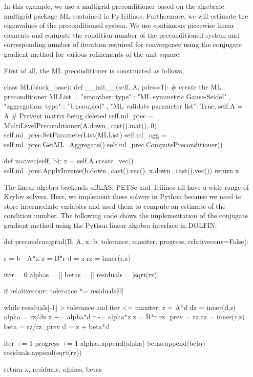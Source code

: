 In this example, we use a multigrid preconditioner based on the
algebraic multigrid package ML contained in
PyTrilinos. Furthermore, we will estimate the
eigenvalues of the preconditioned system. We use continuous piecewise
linear elements and compute the condition number of the preconditioned
system and corresponding number of iteration required for convergence
using the conjugate gradient method
for various refinements of the unit square.

First of all, the ML preconditioner is constructed as follows,
\begin{python}
class ML(block_base):
    def __init__(self, A, pdes=1):
        # create the ML preconditioner
        MLList = {
            "smoother: type"            : "ML symmetric Gauss-Seidel" ,
            "aggregation: type"         : "Uncoupled" ,
            "ML validate parameter list": True,
            }
        self.A = A # Prevent matrix being deleted
        self.ml_prec = MultiLevelPreconditioner(A.down_cast().mat(), 0)
        self.ml_prec.SetParameterList(MLList)
        self.ml_agg = self.ml_prec.GetML_Aggregate()
        self.ml_prec.ComputePreconditioner()

    def matvec(self, b):
        x = self.A.create_vec()
        self.ml_prec.ApplyInverse(b.down_cast().vec(), x.down_cast().vec())
        return x
\end{python}
The linear algebra backends uBLAS, PETSc and Trilinos all have a wide
range of Krylov solvers. Here, we implement these solvers in Python
because we need to store intermediate variables and used them to
compute an estimate of the condition number.  The following code shows
the implementation of the conjugate gradient method using the Python
linear algebra interface in DOLFIN:
\begin{python}
def precondconjgrad(B, A, x, b, tolerance, maxiter, progress, relativeconv=False):

    r = b - A*x
    z = B*r
    d = z
    rz = inner(r,z)

    iter = 0
    alphas = []
    betas = []
    residuals = [sqrt(rz)]

    if relativeconv:
        tolerance *= residuals[0]

    while residuals[-1] > tolerance and iter <= maxiter:
        z = A*d
        dz = inner(d,z)
        alpha = rz/dz
        x += alpha*d
        r -= alpha*z
        z = B*r
        rz_prev = rz
        rz = inner(r,z)
        beta = rz/rz_prev
        d = z + beta*d

        iter += 1
        progress += 1
        alphas.append(alpha)
        betas.append(beta)
        residuals.append(sqrt(rz))

    return x, residuals, alphas, betas
\end{python}
